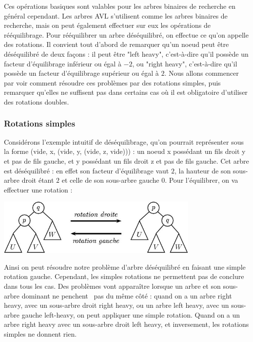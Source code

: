 \documentclass{article}
\begin{document}
Ces opérations basiques sont valables pour les arbres binaires de recherche en général cependant. Les arbres AVL s'utilisent comme les arbres binaires de recherche, mais on peut également effectuer sur eux les opérations de rééquilibrage. Pour rééquilibrer 
un arbre déséquilibré, on effectue ce qu'on appelle des rotations. Il convient tout d'abord de remarquer qu'un noeud peut être déséquilibré de deux façons : il peut 
être "left heavy", c'est-à-dire qu'il possède un facteur d'équilibrage inférieur ou égal à $-2$, ou "right heavy", c'est-à-dire qu'il possède un facteur 
d'équilibrage supérieur ou égal à $2$. Nous allons commencer par voir comment résoudre ces problèmes par des rotations simples, puis remarquer qu'elles ne suffisent pas 
dans certains cas où il est obligatoire d'utiliser des rotations doubles.

\subsubsection{Rotations simples}
Considérons l'exemple intuitif de déséquilibrage, qu'on pourrait représenter sous la forme (vide, x, (vide, y, (vide, z, vide))) : un noeud x possédant un fils droit y et pas de fils gauche, et y possédant un fils droit z et pas de fils gauche. Cet arbre est déséquilibré : en effet son facteur d'équilibrage vaut $2$, la hauteur de son sous-arbre droit étant $2$ et celle de son sous-arbre gauche $0$. Pour l'équilibrer, on va effectuer une rotation :

\includegraphics[width = 10cm]{poly093.jpg}

Ainsi on peut résoudre notre problème d'arbre déséquilibré en faisant une simple rotation gauche. Cependant, les simples rotations ne permettent pas de conclure dans tous les cas. Des problèmes vont apparaître lorsque un arbre et son sous-arbre dominant ne \guillemotleft penchent \guillemotright\ pas du même côté : quand on a un arbre right heavy, avec un sous-arbre droit right heavy, ou un arbre left heavy, avec un sous-arbre gauche left-heavy, on peut appliquer une simple rotation. Quand on a un arbre right heavy avec un sous-arbre droit left heavy, et inversement, les rotations simples ne donnent rien.
\end{document}
